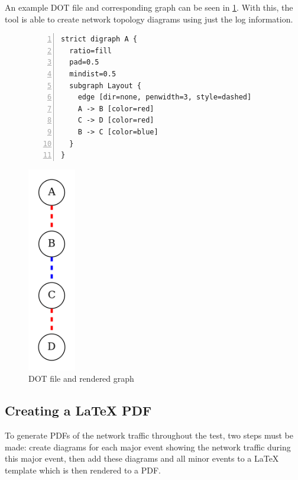 An example DOT file and corresponding graph can be seen in \figurename{ \ref{fig:chapter5DotAndRender}}.
With this, the tool is able to create network topology diagrams using just the log information.
\begin{figure}[H]
    \begin{centering}
        \begin{minipage}{0.6\textwidth}
            \begin{lstlisting}[numbers=left, basicstyle=\small, breaklines, frame=l]
strict digraph A {
  ratio=fill
  pad=0.5
  mindist=0.5
  subgraph Layout {
    edge [dir=none, penwidth=3, style=dashed]
    A -> B [color=red]
    C -> D [color=red]
    B -> C [color=blue]
  }
}
            \end{lstlisting}
        \end{minipage}
        \begin{minipage}{0.15\textwidth}
            \raggedleft
            \includegraphics[height=9cm, keepaspectratio]{Figures/Chapter5-RenderedDot.png}
        \end{minipage}
        \caption{DOT file and rendered graph}
        \label{fig:chapter5DotAndRender}
    \end{centering}
\end{figure}

\subsection{Creating a LaTeX PDF}
To generate PDFs of the network traffic throughout the test, two steps must be made: create diagrams for each major event showing the network traffic during this major event, then add these diagrams and all minor events to a LaTeX template which is then rendered to a PDF.

